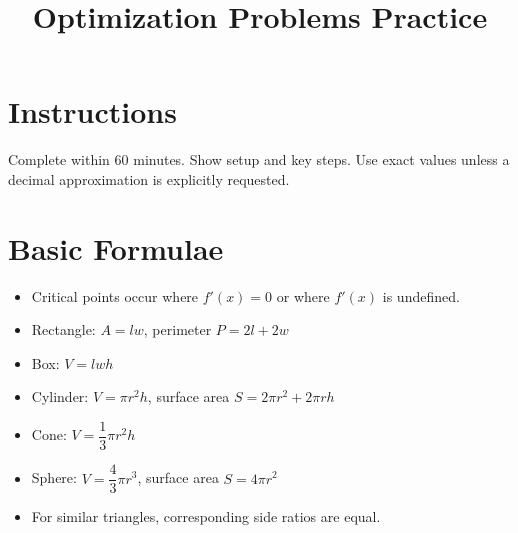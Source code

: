 \documentclass[12pt]{article}
\title{Optimization Problems Practice}
\author{}
\date{}
\begin{document}
\maketitle

\section*{Instructions}
Complete within 60 minutes. Show setup and key steps. Use exact values unless a decimal approximation is explicitly requested.

\section*{Basic Formulae}
\begin{itemize}[leftmargin=1.5em]
  \item Critical points occur where $f'(x)=0$ or where $f'(x)$ is undefined.
  \item Rectangle: $A=lw$, \quad perimeter $P=2l+2w$
  \item Box: $V=lwh$
  \item Cylinder: $V=\pi r^2h$, \quad surface area $S=2\pi r^2+2\pi rh$
  \item Cone: $V=\dfrac13\pi r^2h$
  \item Sphere: $V=\dfrac43\pi r^3$, \quad surface area $S=4\pi r^2$
  \item For similar triangles, corresponding side ratios are equal.
\end{itemize}
\end{document}
